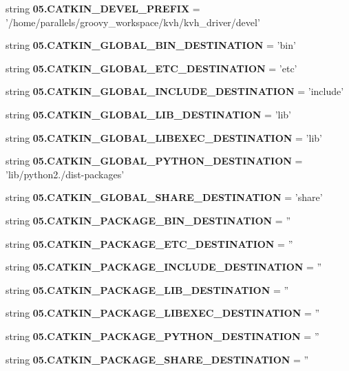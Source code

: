 \begin{DoxyCompactItemize}
\item 
string {\bf 05.\-C\-A\-T\-K\-I\-N\-\_\-\-D\-E\-V\-E\-L\-\_\-\-P\-R\-E\-F\-I\-X} = '/home/parallels/groovy\-\_\-workspace/kvh/kvh\-\_\-driver/devel'
\item 
string {\bf 05.\-C\-A\-T\-K\-I\-N\-\_\-\-G\-L\-O\-B\-A\-L\-\_\-\-B\-I\-N\-\_\-\-D\-E\-S\-T\-I\-N\-A\-T\-I\-O\-N} = 'bin'
\item 
string {\bf 05.\-C\-A\-T\-K\-I\-N\-\_\-\-G\-L\-O\-B\-A\-L\-\_\-\-E\-T\-C\-\_\-\-D\-E\-S\-T\-I\-N\-A\-T\-I\-O\-N} = 'etc'
\item 
string {\bf 05.\-C\-A\-T\-K\-I\-N\-\_\-\-G\-L\-O\-B\-A\-L\-\_\-\-I\-N\-C\-L\-U\-D\-E\-\_\-\-D\-E\-S\-T\-I\-N\-A\-T\-I\-O\-N} = 'include'
\item 
string {\bf 05.\-C\-A\-T\-K\-I\-N\-\_\-\-G\-L\-O\-B\-A\-L\-\_\-\-L\-I\-B\-\_\-\-D\-E\-S\-T\-I\-N\-A\-T\-I\-O\-N} = 'lib'
\item 
string {\bf 05.\-C\-A\-T\-K\-I\-N\-\_\-\-G\-L\-O\-B\-A\-L\-\_\-\-L\-I\-B\-E\-X\-E\-C\-\_\-\-D\-E\-S\-T\-I\-N\-A\-T\-I\-O\-N} = 'lib'
\item 
string {\bf 05.\-C\-A\-T\-K\-I\-N\-\_\-\-G\-L\-O\-B\-A\-L\-\_\-\-P\-Y\-T\-H\-O\-N\-\_\-\-D\-E\-S\-T\-I\-N\-A\-T\-I\-O\-N} = 'lib/python2./dist-\/packages'
\item 
string {\bf 05.\-C\-A\-T\-K\-I\-N\-\_\-\-G\-L\-O\-B\-A\-L\-\_\-\-S\-H\-A\-R\-E\-\_\-\-D\-E\-S\-T\-I\-N\-A\-T\-I\-O\-N} = 'share'
\item 
string {\bf 05.\-C\-A\-T\-K\-I\-N\-\_\-\-P\-A\-C\-K\-A\-G\-E\-\_\-\-B\-I\-N\-\_\-\-D\-E\-S\-T\-I\-N\-A\-T\-I\-O\-N} = ''
\item 
string {\bf 05.\-C\-A\-T\-K\-I\-N\-\_\-\-P\-A\-C\-K\-A\-G\-E\-\_\-\-E\-T\-C\-\_\-\-D\-E\-S\-T\-I\-N\-A\-T\-I\-O\-N} = ''
\item 
string {\bf 05.\-C\-A\-T\-K\-I\-N\-\_\-\-P\-A\-C\-K\-A\-G\-E\-\_\-\-I\-N\-C\-L\-U\-D\-E\-\_\-\-D\-E\-S\-T\-I\-N\-A\-T\-I\-O\-N} = ''
\item 
string {\bf 05.\-C\-A\-T\-K\-I\-N\-\_\-\-P\-A\-C\-K\-A\-G\-E\-\_\-\-L\-I\-B\-\_\-\-D\-E\-S\-T\-I\-N\-A\-T\-I\-O\-N} = ''
\item 
string {\bf 05.\-C\-A\-T\-K\-I\-N\-\_\-\-P\-A\-C\-K\-A\-G\-E\-\_\-\-L\-I\-B\-E\-X\-E\-C\-\_\-\-D\-E\-S\-T\-I\-N\-A\-T\-I\-O\-N} = ''
\item 
string {\bf 05.\-C\-A\-T\-K\-I\-N\-\_\-\-P\-A\-C\-K\-A\-G\-E\-\_\-\-P\-Y\-T\-H\-O\-N\-\_\-\-D\-E\-S\-T\-I\-N\-A\-T\-I\-O\-N} = ''
\item 
string {\bf 05.\-C\-A\-T\-K\-I\-N\-\_\-\-P\-A\-C\-K\-A\-G\-E\-\_\-\-S\-H\-A\-R\-E\-\_\-\-D\-E\-S\-T\-I\-N\-A\-T\-I\-O\-N} = ''

\end{DoxyCompactItemize}
